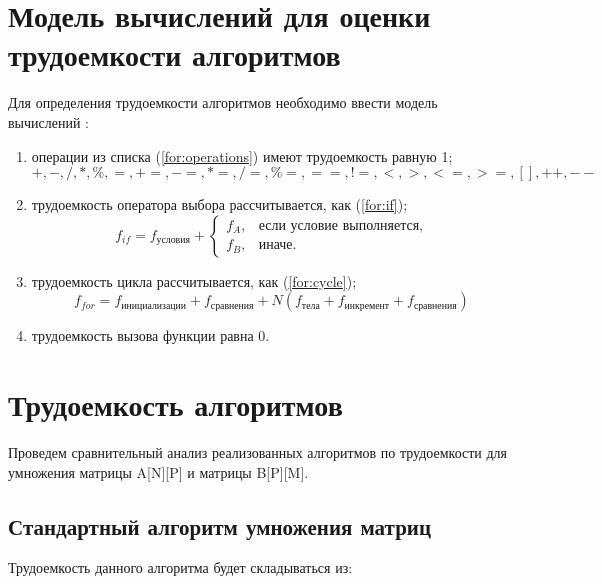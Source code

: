 \section{Модель вычислений для оценки трудоемкости алгоритмов}

Для определения трудоемкости алгоритмов необходимо ввести модель вычислений \cite{model}:

\begin{enumerate}
	\item операции из списка (\ref{for:operations}) имеют трудоемкость равную 1;
	\begin{equation}
		\label{for:operations}
		+, -, /, *, \%, =, +=, -=, *=, /=, \%=, ==, !=, <, >, <=, >=, [], ++, {-}-
	\end{equation}
	\item трудоемкость оператора выбора  рассчитывается, как (\ref{for:if});
	\begin{equation}
		\label{for:if}
		f_{if} = f_{\text{условия}} +
		\begin{cases}
			f_A, & \text{если условие выполняется,}\\
			f_B, & \text{иначе.}
		\end{cases}
	\end{equation}
	\item трудоемкость цикла рассчитывается, как (\ref{for:cycle});
	\begin{equation}
		\label{for:cycle}
		f_{for} = f_{\text{инициализации}} + f_{\text{сравнения}} + N(f_{\text{тела}} + f_{\text{инкремент}} + f_{\text{сравнения}})
	\end{equation}
	\item трудоемкость вызова функции равна 0.
\end{enumerate}

\section{Трудоемкость алгоритмов}

Проведем сравнительный анализ реализованных алгоритмов по трудоемкости для умножения матрицы A[N][P] и матрицы B[P][M].

\subsection{Стандартный алгоритм умножения матриц}

Трудоемкость данного алгоритма будет складываться из:

